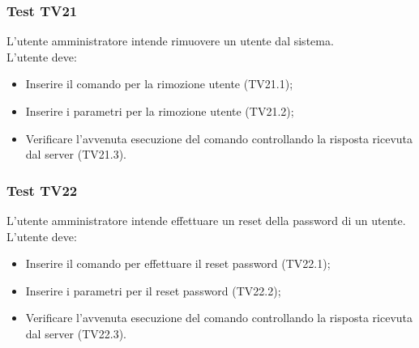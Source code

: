 \documentclass{scalatekids-article}
\begin{document}
\subsubsection{Test TV21}

L'utente amministratore intende rimuovere un utente dal sistema.\\
L'utente deve:
\begin{itemize}
\item Inserire il comando per la rimozione utente (TV21.1);
\item Inserire i parametri per la rimozione utente (TV21.2);
\item Verificare l'avvenuta esecuzione del comando controllando la risposta ricevuta dal server (TV21.3).
\end{itemize}

\subsubsection{Test TV22}

L'utente amministratore intende effettuare un reset della password di un utente.\\
L'utente deve:
\begin{itemize}
\item Inserire il comando per effettuare il reset password (TV22.1);
\item Inserire i parametri per il reset password (TV22.2);
\item Verificare l'avvenuta esecuzione del comando controllando la risposta ricevuta dal server (TV22.3).
\end{itemize}

\listoffigures
\end{document}

